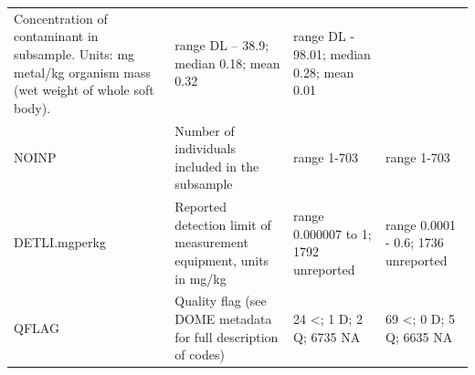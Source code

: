\documentclass[
  12pt,
]{article}
\begin{document}
\begin{longtable}[]{@{}llll@{}}
\begin{minipage}[t]{0.22\columnwidth}
Concentration of contaminant in subsample. Units: mg metal/kg organism
mass (wet weight of whole soft body).\strut
\end{minipage} & \begin{minipage}[t]{0.25\columnwidth}\raggedright
range DL -- 38.9; median 0.18; mean 0.32\strut
\end{minipage} & \begin{minipage}[t]{0.25\columnwidth}\raggedright
range DL - 98.01; median 0.28; mean 0.01\strut
\end{minipage}\tabularnewline
\begin{minipage}[t]{0.15\columnwidth}\raggedright
NOINP\strut
\end{minipage} & \begin{minipage}[t]{0.22\columnwidth}\raggedright
Number of individuals included in the subsample\strut
\end{minipage} & \begin{minipage}[t]{0.25\columnwidth}\raggedright
range 1-703\strut
\end{minipage} & \begin{minipage}[t]{0.25\columnwidth}\raggedright
range 1-703\strut
\end{minipage}\tabularnewline
\begin{minipage}[t]{0.15\columnwidth}\raggedright
DETLI.mgperkg\strut
\end{minipage} & \begin{minipage}[t]{0.22\columnwidth}\raggedright
Reported detection limit of measurement equipment, units in mg/kg\strut
\end{minipage} & \begin{minipage}[t]{0.25\columnwidth}\raggedright
range 0.000007 to 1; 1792 unreported\strut
\end{minipage} & \begin{minipage}[t]{0.25\columnwidth}\raggedright
range 0.0001 - 0.6; 1736 unreported\strut
\end{minipage}\tabularnewline
\begin{minipage}[t]{0.15\columnwidth}\raggedright
QFLAG\strut
\end{minipage} & \begin{minipage}[t]{0.22\columnwidth}\raggedright
Quality flag (see DOME metadata for full description of codes)\strut
\end{minipage} & \begin{minipage}[t]{0.25\columnwidth}\raggedright
24 \textless; 1 D; 2 Q; 6735 NA\strut
\end{minipage} & \begin{minipage}[t]{0.25\columnwidth}\raggedright
69 \textless; 0 D; 5 Q; 6635 NA\strut
\end{minipage}\tabularnewline
\bottomrule
\end{longtable}
\end{document}
